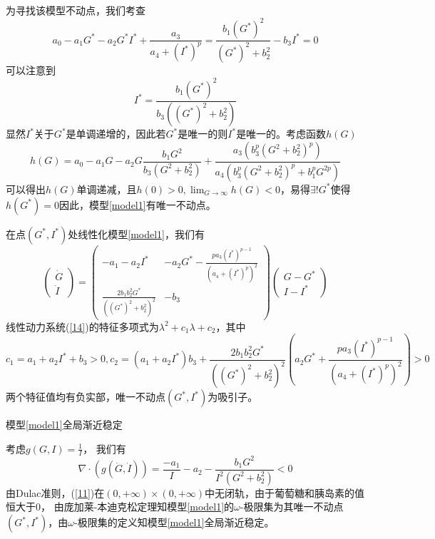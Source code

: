 \begin{pf}
    为寻找该模型不动点，我们考查
    \begin{equation}
        a_0-a_1G^*-a_2G^*I^*+\frac{a_3}{a_4+(I^*)^p}= \frac{b_1 (G^*)^2}{(G^*)^2 + b_2^2} - b_3 I^*=0
    \end{equation}
    可以注意到
    \begin{equation}
        I^*=\frac{b_1 (G^*)^2}{b_3((G^*)^2 + b_2^2)}
    \end{equation}
    显然$I^*$关于$G^*$是单调递增的，因此若$G^*$是唯一的则$I^*$是唯一的。考虑函数$h(G)$
    \begin{equation}
        h(G)=a_0-a_1G-a_2G\frac{b_1G^2}{b_3(G^2+b_2^2)}+\frac{a_3(b_3^p(G^2+b_2^2)^p)}{a_4(b_3^p(G^2+b_2^2)^p+b_1^pG^{2p})}
    \end{equation}
    可以得出$h(G)$单调递减，且$h(0)>0,\lim_{G\to\infty}h(G)<0$，易得$\exists !G^*$使得$h(G^*)=0$因此，模型\ref{model1}有唯一不动点。

    在点$(G^*,I^*)$处线性化模型\ref{model1}，我们有
    \begin{equation}\label{14}
        \begin{pmatrix}
            \dot{G} \\
            \dot{I}
        \end{pmatrix}=\begin{pmatrix}
            -a_1-a_2I^*                              & -a_2G^*-\frac{pa_3(I^*)^{p-1}}{(a_4+(I^*)^p)^2} \\
            \frac{2b_1b_2^2G^*}{((G^*)^2 + b_2^2)^2} & -b_3
        \end{pmatrix}\begin{pmatrix}
            G-G^* \\
            I-I^*
        \end{pmatrix}
    \end{equation}
    线性动力系统(\ref{14})的特征多项式为$\lambda^2+c_1\lambda+c_2$，其中
    \begin{equation*}
        c_1=a_1+a_2I^*+b_3>0, c_2=(a_1+a_2I^*)b_3+\frac{2b_1b_2^2G^*}{((G^*)^2 + b_2^2)^2}(a_2G^*+\frac{pa_3(I^*)^{p-1}}{(a_4+(I^*)^p)^2})>0
    \end{equation*}
    两个特征值均有负实部，唯一不动点$(G^*,I^*)$为吸引子\cite{strogatz2018nonlinear}。

\end{pf}
\begin{prop}\label{prop2}
    模型\ref{model1}全局渐近稳定
\end{prop}
\begin{pf}
    考虑$g(G,I)=\frac{1}{I}$， 我们有
    \begin{equation}
        \nabla\cdot(g(\dot{G},\dot{I}))=\frac{-a_1}{I}-a_2-\frac{b_1 G^2}{I^2(G^2 + b_2^2)}<0
    \end{equation}
    由Dulac准则，(\ref{11})在$(0,+\infty)\times (0,+\infty)$中无闭轨，由于葡萄糖和胰岛素的值恒大于$0$， 由庞加莱-本迪克松定理知模型\ref{model1}的$\omega$-极限集为其唯一不动点$(G^*,I^*)$，由$\omega$-极限集的定义知模型\ref{model1}全局渐近稳定。
\end{pf}

